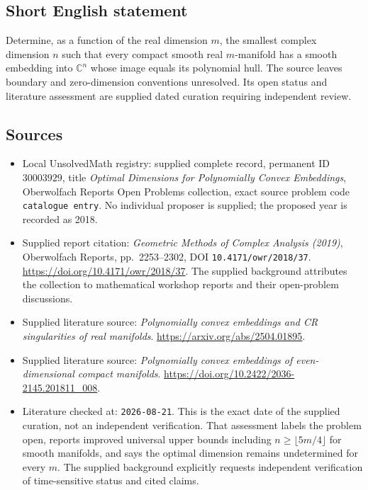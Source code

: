 \documentclass[11pt]{article}
\newcommand{\C}{\mathbb{C}}
\begin{document}
\subsection{Short English statement}
Determine, as a function of the real dimension \(m\), the smallest complex dimension \(n\) such that every compact smooth real \(m\)-manifold has a smooth embedding into \(\C^n\) whose image equals its polynomial hull. The source leaves boundary and zero-dimension conventions unresolved. Its open status and literature assessment are supplied dated curation requiring independent review.
\subsection{Sources}
\begin{itemize}
\item Local UnsolvedMath registry: supplied complete record, permanent ID \(30003929\), title \emph{Optimal Dimensions for Polynomially Convex Embeddings}, Oberwolfach Reports Open Problems collection, exact source problem code \texttt{catalogue entry}. No individual proposer is supplied; the proposed year is recorded as 2018.
\item Supplied report citation: \emph{Geometric Methods of Complex Analysis (2019)}, Oberwolfach Reports, pp.\ 2253--2302, DOI \texttt{10.4171/owr/2018/37}. \url{https://doi.org/10.4171/owr/2018/37}. The supplied background attributes the collection to mathematical workshop reports and their open-problem discussions.
\item Supplied literature source: \emph{Polynomially convex embeddings and CR singularities of real manifolds}. \url{https://arxiv.org/abs/2504.01895}.
\item Supplied literature source: \emph{Polynomially convex embeddings of even-dimensional compact manifolds}. \url{https://doi.org/10.2422/2036-2145.201811_008}.
\item Literature checked at: \texttt{2026-08-21}. This is the exact date of the supplied curation, not an independent verification. That assessment labels the problem open, reports improved universal upper bounds including \(n\geq\lfloor5m/4\rfloor\) for smooth manifolds, and says the optimal dimension remains undetermined for every \(m\). The supplied background explicitly requests independent verification of time-sensitive status and cited claims.
\end{itemize}
\end{document}
